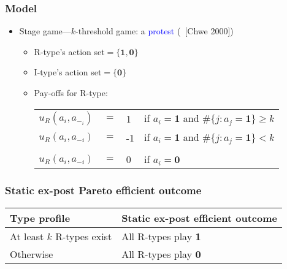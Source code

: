 \documentclass[9pt]{beamer}
\begin{document}
\begin{frame}
  \frametitle{Model}

  \begin{itemize}

  \item Stage game---\alert{$k$}-threshold game: a \textcolor{blue}{protest} (~[Chwe 2000])




\begin{itemize}
\item R-type's action set$=\{\textbf{1},\textbf{0}\}$
\item I-type's action set$=\{\textbf{0}\}$
\item Pay-offs for R-type:
\begin{table}[h]
\begin{tabular}{llll}
$u_{R}(a_{i},a_{-_i})$ & $=$ & 1 & if $a_{i}=\textbf{1}$ and $\#\{j:a_{j}=\textbf{1}\}\geq {k}$ \\
$u_{R}(a_{i},a_{-i})$ & $=$ & -1 & if $a_{i}=\textbf{1}$ and $\#\{j:a_{j}=\textbf{1}\}< {k}$ \\
\\
$u_{R}(a_{i},a_{-i})$ & $=$ & 0 & if $a_{i}=\textbf{0}$ 
\end{tabular}

\end{table}
\end{itemize}
  

 \end{itemize}

\end{frame}



\begin{frame}
  \frametitle{Static ex-post Pareto efficient outcome}



\begin{table}[h]
\begin{tabular}{ll}
Type profile & Static ex-post efficient outcome \\
\hline
At least $k$ R-types exist & All R-types play \textbf{1}  \\
Otherwise &  All R-types play \textbf{0} 
\end{tabular}
\end{table}
\end{frame}
\end{document}
